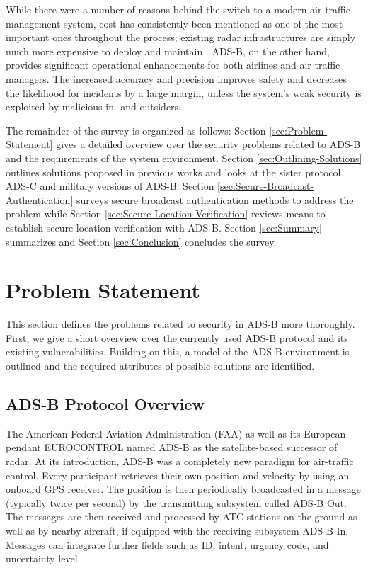 \documentclass[english]{IEEEtran}
\begin{document}
While there were a number of reasons behind the switch to a modern
air traffic management system, cost has consistently been mentioned
as one of the most important ones throughout the process; existing
radar infrastructures are simply much more expensive to deploy and
maintain \cite{Smith2006}. ADS-B, on the other hand, provides significant
operational enhancements for both airlines and air traffic managers.
The increased accuracy and precision improves safety and decreases
the likelihood for incidents by a large margin, unless the system's
weak security is exploited by malicious in- and outsiders.

The remainder of the survey is organized as follows: Section \ref{sec:Problem-Statement}
gives a detailed overview over the security problems related to ADS-B
and the requirements of the system environment. Section \ref{sec:Outlining-Solutions}
outlines solutions proposed in previous works and looks at the sister
protocol ADS-C and military versions of ADS-B. Section \ref{sec:Secure-Broadcast-Authentication}
surveys secure broadcast authentication methods to address the problem
while Section \ref{sec:Secure-Location-Verification} reviews means
to establish secure location verification with ADS-B. Section \ref{sec:Summary}
summarizes and Section \ref{sec:Conclusion} concludes the survey. 


\section{Problem Statement \label{sec:Problem-Statement}}

This section defines the problems related to security in ADS-B more
thoroughly. First, we give a short overview over the currently used
ADS-B protocol and its existing vulnerabilities. Building on this,
a model of the ADS-B environment is outlined and the required attributes
of possible solutions are identified.\\



\subsection{ADS-B Protocol Overview}

The American Federal Aviation Administration (FAA) as well as its
European pendant EUROCONTROL named ADS-B as the satellite-based successor
of radar. At its introduction, ADS-B was a completely new paradigm
for air-traffic control. Every participant retrieves their own position
and velocity by using an onboard GPS receiver. The position is then
periodically broadcasted in a message (typically twice per second)
by the transmitting subsystem called ADS-B Out.\emph{ }The messages
are then received and processed by ATC stations on the ground as well
as by nearby aircraft, if equipped with the receiving subsystem ADS-B
In.\emph{ }Messages can integrate further fields such as ID, intent,
urgency code, and uncertainty level.\emph{ }
\end{document}
